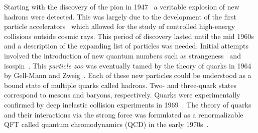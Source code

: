 Starting with the discovery of the pion in 1947~\cite{DiscoveryPimeson} a veritable explosion of new hadrons were detected.
This was largely due to the development of the first particle accelerators~\cite{ProductionHighSpeed} which allowed for the study of controlled high-energy collisions outside cosmic rays.
This period of discovery lasted until the mid 1960s and a description of the expanding list of particles was needed.
Initial attempts involved the introduction of new quantum numbers such as strangeness~\cite{Strange2, Strange3} and isospin~\cite{StrongIso1, StrongIso2, StrongIso3,StrongIso4}.
This \textit{particle zoo} was eventually tamed by the theory of quarks in 1964 by Gell-Mann and Zweig~\cite{GellMan1964,Zweig1964}.
Each of these new particles could be understood as a bound state of multiple quarks called hadrons.
Two- and three-quark states correspond to mesons and baryons, respectively.
Quarks were experimentally confirmed by deep inelastic collision experiments in 1969~\cite{Quark1, Quark2}.
The theory of quarks and their interactions via the strong force was formulated as a renormalizable QFT called quantum chromodynamics (QCD) in the early 1970s~\cite{QCD1,QCD2,QCD3}.

